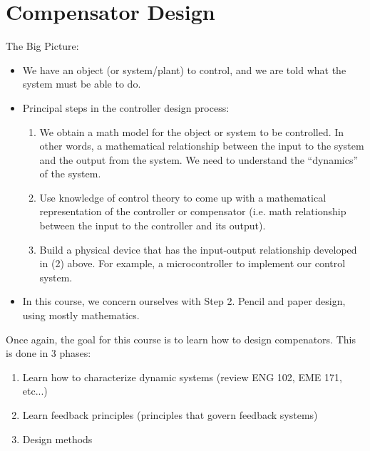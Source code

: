 \documentclass{book}
\begin{document}
\section*{Compensator Design}
The Big Picture:
\begin{itemize}
	\item We have an object (or system/plant) to control, and we are told what the system must be able to do.
	\item Principal steps in the controller design process:
	\begin{enumerate}
		\item We obtain a math model for the object or system to be controlled. In other words, a mathematical relationship between the input to the system and the output from the system. We need to understand the ``dynamics'' of the system.
		\item Use knowledge of control theory to come up with a mathematical representation of the controller or compensator (i.e. math relationship between the input to the controller and its output).
		\item Build a physical device that has the input-output relationship developed in (2) above. For example, a microcontroller to implement our control system.
	\end{enumerate}
	\item In this course, we concern ourselves with Step 2. Pencil and paper design, using mostly mathematics. 
\end{itemize}

Once again, the goal for this course is to learn how to design compenators. This is done in 3 phases:
\begin{enumerate}
	\item Learn how to characterize dynamic systems (review ENG 102, EME 171, etc...)
	\item Learn feedback principles (principles that govern feedback systems)
	\item Design methods
\end{enumerate}
\end{document}
